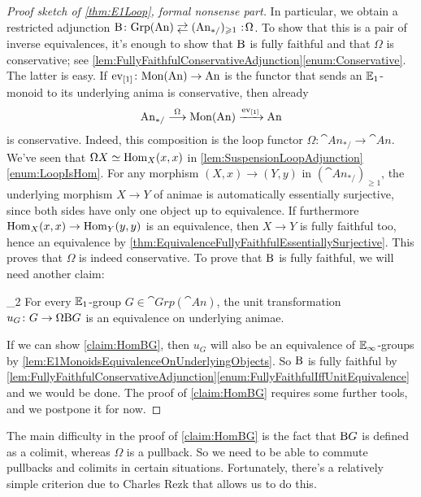 \begin{proof}[Proof sketch of \cref{thm:E1Loop}, formal nonsense part]
	In particular, we obtain a restricted adjunction $\B\colon \cat{Grp}(\cat{An})\shortdoublelrmorphism (\cat{An}_{*/})_{\geqslant 1}\noloc \Omega$. To show that this is a pair of inverse equivalences, it's enough to show that $\mathrm{B}$ is fully faithful and that $\Omega$ is conservative; see \cref{lem:FullyFaithfulConservativeAdjunction}\cref{enum:Conservative}. The latter is easy. If $\operatorname{ev}_{[1]}\colon \mathrm{Mon}(\mathrm{An})\rightarrow \mathrm{An}$ is the functor  that sends an $\mathbb{E}_1$-monoid to its underlying anima is conservative, then already
	\begin{equation*}
		\mathrm{An}_{*/}\overset{\Omega}{\longrightarrow} \mathrm{Mon}(\mathrm{An})\xrightarrow{\operatorname{ev}_{[1]}}\mathrm{An}
	\end{equation*}
	is conservative. Indeed, this composition is the loop functor $\Omega\colon \cat{An}_{*/}\rightarrow \cat{An}$. We've seen that $\Omega X\simeq \operatorname{Hom}_X(x,x)$ in \cref{lem:SuspensionLoopAdjunction}\cref{enum:LoopIsHom}. For any morphism $(X,x)\rightarrow (Y,y)$ in $(\cat{An}_{*/})_{\geqslant 1}$, the underlying morphism $X\rightarrow Y$ of animae is automatically essentially surjective, since both sides have only one object up to equivalence. If furthermore $\operatorname{Hom}_X(x,x)\rightarrow\operatorname{Hom}_Y(y,y)$ is an equivalence, then $X\rightarrow Y$ is fully faithful too, hence an equivalence by \cref{thm:EquivalenceFullyFaithfulEssentiallySurjective}. This proves that $\Omega$ is indeed conservative. To prove that $\mathrm{B}$ is fully faithful, we will need another claim:
	\begin{alphanumerate}\itshape
		\item[\boxtimes_2] For every $\mathbb{E}_1$-group $G\in\cat{Grp}(\cat{An})$, the unit transformation $u_G\colon G\rightarrow \Omega\mathrm{B} G$ is an equivalence on underlying animae.\label{claim:HomBG}
	\end{alphanumerate}
	If we can show \cref{claim:HomBG}, then $u_G$ will also be an equivalence of $\mathbb{E}_\infty$-groups by \cref{lem:E1MonoidsEquivalenceOnUnderlyingObjects}. So $\mathrm{B}$ is fully faithful by \cref{lem:FullyFaithfulConservativeAdjunction}\cref{enum:FullyFaithfulIffUnitEquivalence} and we would be done. The proof of \cref{claim:HomBG} requires some further tools, and we postpone it for now.
\end{proof}
The main difficulty in the proof of \cref{claim:HomBG} is the fact that $\mathrm{B} G$ is defined as a colimit, whereas $\Omega$ is a pullback. So we need to be able to commute pullbacks and colimits in certain situations. Fortunately, there's a relatively simple criterion due to Charles Rezk \cite[Proposition~\href{https://rezk.web.illinois.edu/i-hate-the-pi-star-kan-condition.pdf\#page=3}{2.4}]{RezkEquifibrancy} that allows us to do this.
